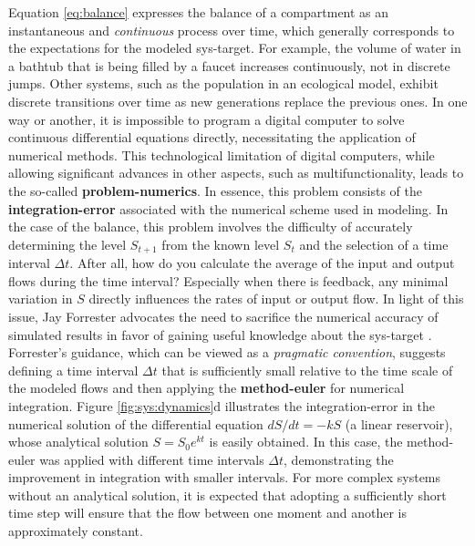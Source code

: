 \documentclass[./main_en.tex]{subfiles}
\begin{document}
\par Equation \eqref{eq:balance} expresses the balance of a compartment as an instantaneous and \textit{continuous} process over time, which generally corresponds to the expectations for the modeled \gls{sys-target}. For example, the volume of water in a bathtub that is being filled by a faucet increases continuously, not in discrete jumps. Other systems, such as the population in an ecological \gls{model}, exhibit discrete transitions over time as new generations replace the previous ones. In one way or another, it is impossible to program a digital computer to solve continuous differential equations directly, necessitating the application of numerical methods. This technological limitation of digital computers, while allowing significant advances in other aspects, such as multifunctionality, leads to the so-called \textbf{\gls{problem-numerics}}. In essence, this problem consists of the \textbf{\gls{integration-error}} associated with the numerical scheme used in modeling. In the case of the balance, this problem involves the difficulty of accurately determining the level $S_{t+1}$ from the known level $S_t$ and the selection of a time interval $\Delta t$. After all, how do you calculate the average of the input and output flows during the time interval? Especially when there is \gls{feedback}, any minimal variation in $S$ directly influences the rates of input or output flow. In light of this issue, Jay Forrester advocates the need to sacrifice the numerical accuracy of simulated results in favor of gaining useful knowledge about the \gls{sys-target} \cite{forrester1964}. Forrester's guidance, which can be viewed as a \textit{pragmatic convention}, suggests defining a time interval $\Delta t$ that is sufficiently small relative to the time scale of the modeled flows and then applying the \textbf{\gls{method-euler}} for numerical integration. Figure \ref{fig:sys:dynamics}d illustrates the \gls{integration-error} in the numerical solution of the differential equation $dS/dt = -kS$ (a linear reservoir), whose analytical solution $S = S_0e^{kt}$ is easily obtained. In this case, the \gls{method-euler} was applied with different time intervals $\Delta t$, demonstrating the improvement in integration with smaller intervals. For more complex systems without an analytical solution, it is expected that adopting a sufficiently short time step will ensure that the flow between one moment and another is approximately constant.
\end{document}

